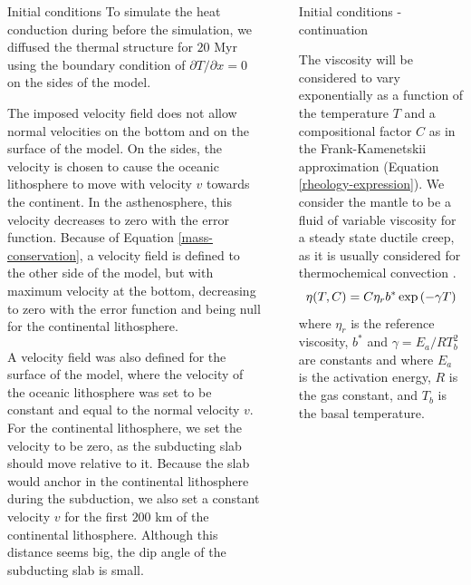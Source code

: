 \documentclass[final]{beamer}
\newlength{\sepwidth}
\newlength{\colwidth}
\newcommand{\separatorcolumn}{\begin{column}{\sepwidth}\end{column}}
\begin{document}
\begin{frame}[t]
\begin{columns}[t]
\begin{column}{\colwidth}
\begin{block}{Initial conditions}
   To simulate the heat conduction during before the simulation, we diffused the thermal structure for $20$ Myr using the boundary condition of $\partial T/\partial x=0$ on the sides of the model.

\heading{\textcolor{darkblue}{Velocity field}}
        
  The imposed velocity field does not allow normal velocities on the bottom and on the surface of the model. On the sides, the velocity is chosen to cause the oceanic lithosphere to move with velocity $v$ towards the continent. In the asthenosphere, this velocity decreases to zero with the error function. Because of Equation \ref{mass-conservation}, a velocity field is defined to the other side of the model, but with maximum velocity at the bottom, decreasing to zero with the error function and being null for the continental lithosphere.

  A velocity field was also defined for the surface of the model, where the velocity of the oceanic lithosphere was set to be constant and equal to the normal velocity $v$. For the continental lithosphere, we set the velocity to be zero, as the subducting slab should move relative to it. Because the slab would anchor in the continental lithosphere during the subduction, we also set a constant velocity $v$ for the first $200$ km of the continental lithosphere. Although this distance seems big, the dip angle of the subducting slab is small.
        
  \end{block}

\end{column}

\separatorcolumn

\begin{column}{\colwidth}
    \begin{block}{Initial conditions - continuation}

    \heading{\textcolor{darkblue}{Rheology model}}
    
      The viscosity will be considered to vary exponentially as a function of the temperature $T$ and a compositional factor $C$ as in the Frank-Kamenetskii approximation (Equation \ref{rheology-expression}). We consider the mantle to be a fluid of variable viscosity for a steady state ductile creep, as it is usually considered for thermochemical convection \cite{solomatov2000scaling}.
      \begin{equation}{\label{rheology-expression}}
          \eta(T,C) = C\eta_r b^* \exp{(-\gamma T)}
      \end{equation}
      \noindent where $\eta_r$ is the reference viscosity, $b^*$ and $\gamma=E_{a}/RT_{b}^{2}$ are constants and where $E_a$ is the activation energy, $R$ is the gas constant, and $T_b$ is the basal temperature.
    \end{block}


\end{column}
\end{columns}
\end{frame}
\end{document}
